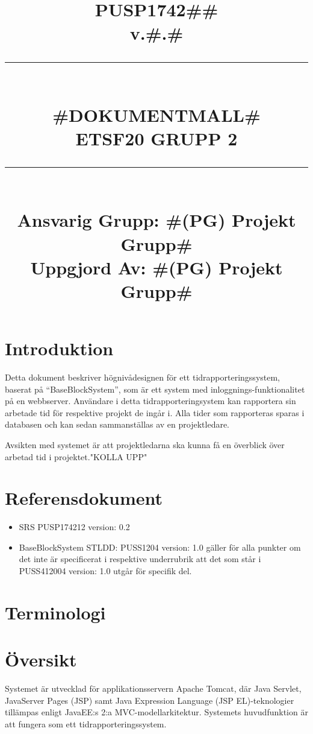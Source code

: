 \documentclass[paper=a4, fontsize=11pt,twoside]{article}
\title{
		\documentNumber{#1}																						
		\documentVersion{#2}																				
		\HRule{0.5pt} \\ %
		\LARGE \textbf{\uppercase{#3}} \\
		\large \textbf{\uppercase{ETSF20 Grupp 2}} 
		\HRule{2pt} \\ [1.5cm]    
		\normalsize            
		\documentResponsible{#4} \\ 
		\documentCreator{#4}  
	}
\newcommand{\HRule}[1]{\rule{\linewidth}{#1}}
\newcommand{\documentNumber}[1]{\centering PUSP1742#1 \\[1.0cm]}
\newcommand{\documentVersion}[1]{\centering \small{v.#1} \\[1.0cm]}
\newcommand{\documentResponsible}[1]{\centering  Ansvarig Grupp: #1}
\newcommand{\documentCreator}[1]{\centering Uppgjord Av: #1}
\newcommand{\grouptitlepage}[4]{ 
	\title{
		\documentNumber{#1}																						
		\documentVersion{#2}																				
		\HRule{0.5pt} \\ %
		\LARGE \textbf{\uppercase{#3}} \\
		\large \textbf{\uppercase{ETSF20 Grupp 2}} 
		\HRule{2pt} \\ [1.5cm]    
		\normalsize            
		\documentResponsible{#4} \\ 
		\documentCreator{#4}  
	}																							
	\maketitle																							
	\thispagestyle{empty} 																					
	\newpage 
}
\begin{document}
\grouptitlepage
{\#\#}
{\#.\#}
{\#Dokumentmall\#}
{\#(PG) Projekt Grupp\#}
\tableofcontents

\section{Introduktion}
Detta dokument beskriver högnivådesignen för ett tidrapporteringssystem, baserat på “BaseBlockSystem”, som är ett system med inloggnings-funktionalitet på en webbserver.
Användare i detta tidrapporteringsystem kan rapportera sin arbetade tid för respektive projekt de ingår i. Alla tider som rapporteras sparas i databasen och kan sedan sammanställas av en projektledare. 

Avsikten med systemet är att projektledarna ska kunna få en överblick över arbetad tid i projektet."KOLLA UPP"

\section{Referensdokument}
\begin{itemize}
\item SRS PUSP174212 version: 0.2

\item BaseBlockSystem STLDD: PUSS1204 version: 1.0 gäller för alla punkter om det inte är specificerat i respektive underrubrik att det som står i PUSS412004 version: 1.0 utgår för specifik del.

\end{itemize}

\section{Terminologi}


\section{Översikt}
Systemet är utvecklad för applikationsservern Apache Tomcat, där Java Servlet, JavaServer Pages (JSP) samt Java Expression Language (JSP EL)-teknologier tillämpas enligt JavaEE:s 2:a MVC-modellarkitektur. Systemets huvudfunktion är att fungera som ett tidrapporteringssystem.
\end{document}

